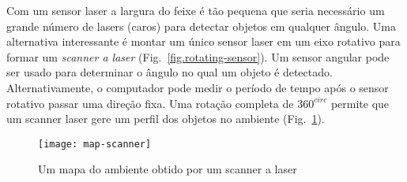 
Com um sensor laser a largura do feixe é tão pequena que seria necessário um grande número de lasers (caros) para detectar objetos em qualquer ângulo. Uma alternativa interessante  é montar um único sensor laser em um eixo rotativo para formar um \emph{scanner a laser} (Fig.~\ref{fig.rotating-sensor}). Um sensor angular pode ser usado para determinar o ângulo no qual um objeto é detectado. Alternativamente, o computador pode medir o período de tempo após o sensor rotativo passar uma direção fixa. Uma rotação completa de $360^{circ}$ permite que um scanner laser gere um perfil dos objetos no ambiente (Fig.~\ref{fig.laser-scanner}).

\begin{figure}
\begin{center}
\texttt{[image: map-scanner]}
\end{center}
\caption{Um mapa do ambiente obtido por um scanner a laser}\label{fig.laser-scanner}
\end{figure}

